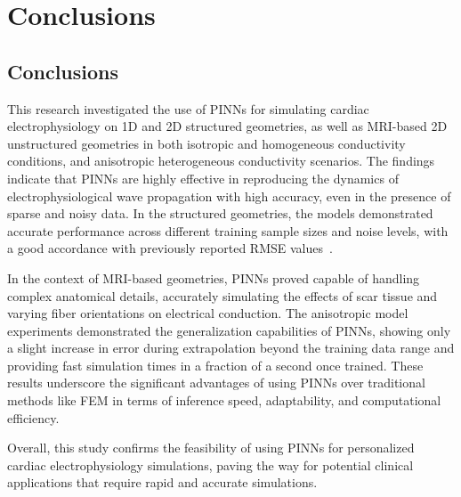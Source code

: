 \chapter{Conclusions}
\section{Conclusions}
This research investigated the use of PINNs for simulating cardiac electrophysiology on 1D and 2D structured geometries, as well as MRI-based 2D unstructured geometries in both isotropic and homogeneous conductivity conditions, and anisotropic heterogeneous conductivity scenarios.
The findings indicate that PINNs are highly effective in reproducing the dynamics of electrophysiological wave propagation with high accuracy, even in the presence of sparse and noisy data. In the structured geometries, the models demonstrated accurate performance across different training sample sizes and noise levels, with a good accordance with previously reported RMSE values~\cite{EP-PINNs}.

In the context of MRI-based geometries, PINNs proved capable of handling complex anatomical details, accurately simulating the effects of scar tissue and varying fiber orientations on electrical conduction. The anisotropic model experiments demonstrated the generalization capabilities of PINNs, showing only a slight increase in error during extrapolation beyond the training data range and providing fast simulation times in a fraction of a second once trained. These results underscore the significant advantages of using PINNs over traditional methods like FEM in terms of inference speed, adaptability, and computational efficiency.

Overall, this study confirms the feasibility of using PINNs for personalized cardiac electrophysiology simulations, paving the way for potential clinical applications that require rapid and accurate simulations.
